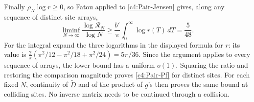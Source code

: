 Finally \(\rho_N\log r\ge0\), so Fatou applied to
\eqref{c4:Pair-Jensen} gives, along any sequence of distinct site arrays,
\[
 \liminf_{N\to\infty}\frac{\log\mathcal R_N}{\log N}
 \ge\frac{b'}\pi\int_0^\infty\log r(T)\,dT=\frac5{48}.
\]
For the integral expand the three logarithms in the displayed formula
for \(r\): its value is
\(\frac2\pi(\pi^2/12-\pi^2/18+\pi^2/24)=5\pi/36\).
Since the argument applies to every sequence of arrays, the lower
bound has a uniform \(o(1)\). Squaring the ratio and restoring the
comparison magnitude proves \eqref{c4:Pair-Pf} for distinct sites.
For each fixed \(N\), continuity of \(\widetilde D\) and of the product
of \(g\)'s then proves the same bound at colliding sites. No inverse
matrix needs to be continued through a collision.
